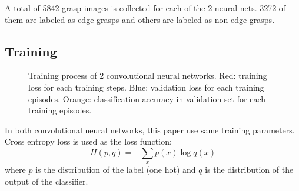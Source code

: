 \documentclass[letterpaper]{article} %
\begin{document}
A total of 5842 grasp images is collected for each of the 2 neural nets. 3272 of them are labeled as edge grasps and others are labeled as non-edge grasps.

\subsection{Training}
\begin{figure}[!b]



\caption{Training process of 2 convolutional neural networks. Red: training loss for each training steps. Blue: validation loss for each training episodes. Orange: classification accuracy in validation set for each training episodes.}

\end{figure}
In both convolutional neural networks, this paper use same training parameters. Cross entropy loss is used as the loss function: 
\begin{equation}
    H(p, q)=-\sum_x p(x)\log q(x)
\end{equation}
where $p$ is the distribution of the label (one hot) and $q$ is the distribution of the output of the classifier.
\end{document}
